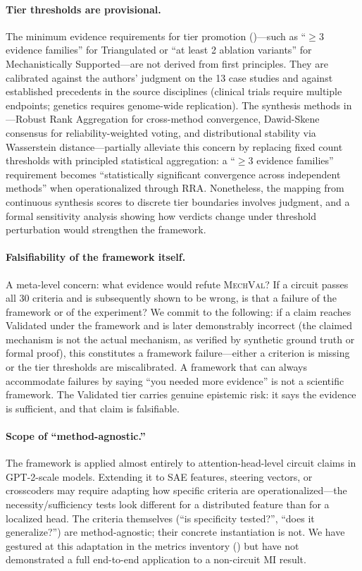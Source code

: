 \documentclass{article}
\newcommand{\mechval}{\textsc{MechVal}}
\begin{document}
\paragraph{Tier thresholds are provisional.} The minimum evidence requirements for tier promotion ()---such as ``$\geq 3$ evidence families'' for Triangulated or ``at least 2 ablation variants'' for Mechanistically Supported---are not derived from first principles. They are calibrated against the authors' judgment on the 13 case studies and against established precedents in the source disciplines (clinical trials require multiple endpoints; genetics requires genome-wide replication). The synthesis methods in ---Robust Rank Aggregation for cross-method convergence, Dawid-Skene consensus for reliability-weighted voting, and distributional stability via Wasserstein distance---partially alleviate this concern by replacing fixed count thresholds with principled statistical aggregation: a ``$\geq 3$ evidence families'' requirement becomes ``statistically significant convergence across independent methods'' when operationalized through RRA. Nonetheless, the mapping from continuous synthesis scores to discrete tier boundaries involves judgment, and a formal sensitivity analysis showing how verdicts change under threshold perturbation would strengthen the framework.

\paragraph{Falsifiability of the framework itself.} A meta-level concern: what evidence would refute \mechval{}? If a circuit passes all 30 criteria and is subsequently shown to be wrong, is that a failure of the framework or of the experiment? We commit to the following: if a claim reaches Validated under the framework and is later demonstrably incorrect (the claimed mechanism is not the actual mechanism, as verified by synthetic ground truth or formal proof), this constitutes a framework failure---either a criterion is missing or the tier thresholds are miscalibrated. A framework that can always accommodate failures by saying ``you needed more evidence'' is not a scientific framework. The Validated tier carries genuine epistemic risk: it says the evidence is sufficient, and that claim is falsifiable.

\paragraph{Scope of ``method-agnostic.''}  The framework is applied almost entirely to attention-head-level circuit claims in GPT-2-scale models. Extending it to SAE features, steering vectors, or crosscoders may require adapting how specific criteria are operationalized---the necessity/sufficiency tests look different for a distributed feature than for a localized head. The criteria themselves (``is specificity tested?'', ``does it generalize?'') are method-agnostic; their concrete instantiation is not. We have gestured at this adaptation in the metrics inventory () but have not demonstrated a full end-to-end application to a non-circuit MI result.
\end{document}
